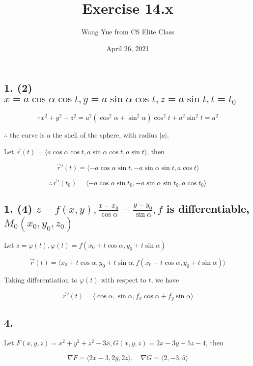 \documentclass{article}
\begin{document}
  \title{Exercise 14.x}
  \author{Wang Yue from CS Elite Class}
  \date{April 26, 2021}
  \maketitle

  \subsection*{1. (2) $x = a\cos \alpha \cos t, y = a\sin \alpha \cos t, z = a\sin t, t = t_0$}

  $$\because x^2+y^2+z^2 = a^2(\cos^2 \alpha + \sin^2 \alpha) \cos^2 t + a^2 \sin^2 t = a^2$$

  $\therefore$ the curve is a the shell of the sphere, with radius $|a|$.

  Let $\overrightarrow r (t) = \langle a\cos \alpha \cos t, a \sin \alpha \cos t, a \sin t \rangle$, then

  $$\overrightarrow r '(t) = \langle -a \cos \alpha \sin t, -a\sin \alpha \sin t, a \cos t \rangle$$

  $$\therefore \overrightarrow r '(t_0) = \langle -a \cos \alpha \sin t_0, -a\sin \alpha \sin t_0, a \cos t_0 \rangle$$

  \subsection*{1. (4) $z = f(x, y), \frac{x - x_0}{\cos \alpha} = \frac{y - y_0}{\sin \alpha}, f$ is differentiable, $M_0(x_0, y_0, z_0)$}

  Let $z = \varphi (t), \varphi (t) =  f(x_0 + t\cos \alpha,  y_0 + t\sin \alpha)$

  $$\overrightarrow r (t) = \langle
    x_0 + t\cos \alpha, 
    y_0 + t\sin \alpha, 
    f(x_0 + t\cos \alpha, y_0 + t\sin \alpha)
  \rangle $$

  Taking differentiation to $\varphi(t)$ with respect to $t$, we have

  $$\overrightarrow r '(t) = \langle \cos \alpha, \sin \alpha, f_x \cos \alpha + f_y \sin \alpha \rangle$$

  \subsection*{4. }

  Let $F(x, y, z) = x^2+y^2+z^2-3x, G(x, y, z) = 2x - 3y + 5z - 4$, then

  $$\nabla F = \langle 2x-3, 2y, 2z \rangle, \quad \nabla G = \langle 2, -3, 5 \rangle$$
\end{document}
